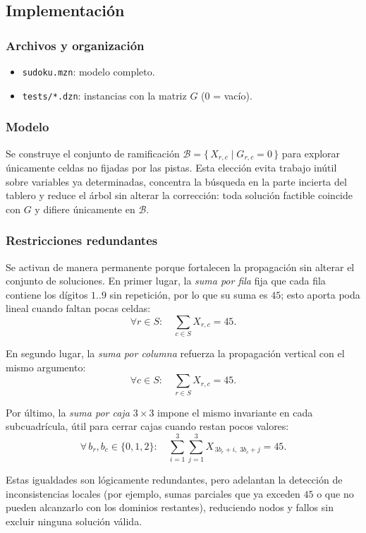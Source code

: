 
\subsection{Implementación}\label{sec:implementacion}

\subsubsection*{Archivos y organización}
\begin{itemize}
  \item \texttt{sudoku.mzn}: modelo completo.
  \item \texttt{tests/*.dzn}: instancias con la matriz \(G\) (0 = vacío).
\end{itemize}

\subsubsection*{Modelo}
Se construye el conjunto de ramificación \(\mathcal{B}=\{\,X_{r,c}\mid G_{r,c}=0\,\}\) para explorar únicamente celdas no fijadas por las pistas. Esta elección evita trabajo inútil sobre variables ya determinadas, concentra la búsqueda en la parte incierta del tablero y reduce el árbol sin alterar la corrección: toda solución factible coincide con \(G\) y difiere únicamente en \(\mathcal{B}\).

\subsubsection*{Restricciones redundantes}
Se activan de manera permanente porque fortalecen la propagación sin alterar el conjunto de soluciones. En primer lugar, la \emph{suma por fila} fija que cada fila contiene los dígitos \(1..9\) sin repetición, por lo que su suma es \(45\); esto aporta poda lineal cuando faltan pocas celdas:
\[
\forall r \in S:\quad \sum_{c \in S} X_{r,c} = 45.
\]

En segundo lugar, la \emph{suma por columna} refuerza la propagación vertical con el mismo argumento:
\[
\forall c \in S:\quad \sum_{r \in S} X_{r,c} = 45.
\]

Por último, la \emph{suma por caja \(3\times3\)} impone el mismo invariante en cada subcuadrícula, útil para cerrar cajas cuando restan pocos valores:
\[
\forall\, b_r,b_c \in \{0,1,2\}:\quad
\sum_{i=1}^{3}\sum_{j=1}^{3} X_{\,3b_r+i,\;3b_c+j} = 45.
\]

Estas igualdades son lógicamente redundantes, pero adelantan la detección de inconsistencias locales (por ejemplo, sumas parciales que ya exceden \(45\) o que no pueden alcanzarlo con los dominios restantes), reduciendo nodos y fallos sin excluir ninguna solución válida.

